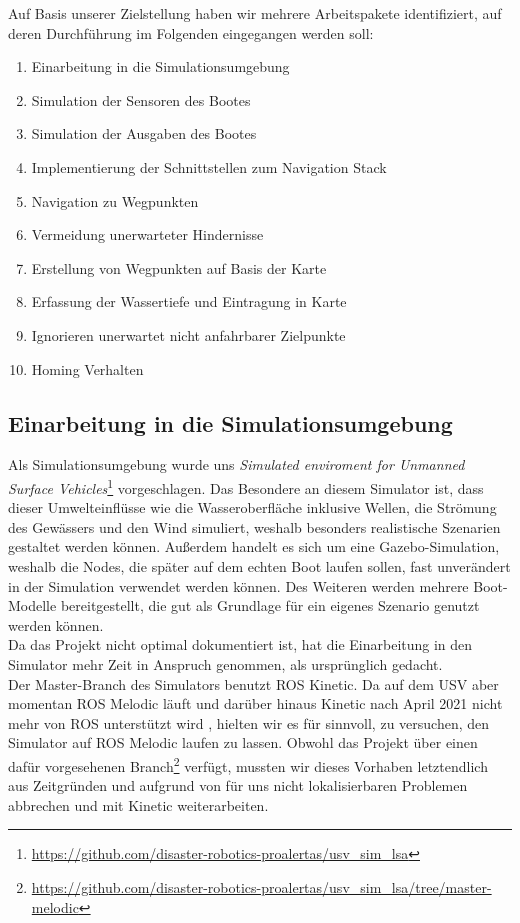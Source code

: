 \documentclass[11pt]{article}
\begin{document}
Auf Basis unserer Zielstellung haben wir mehrere Arbeitspakete identifiziert, auf deren Durchführung im Folgenden eingegangen werden soll:
\begin{enumerate}
	\item Einarbeitung in die Simulationsumgebung
	\item Simulation der Sensoren des Bootes
	\item Simulation der Ausgaben des Bootes
	\item Implementierung der Schnittstellen zum Navigation Stack
	\item Navigation zu Wegpunkten
	\item Vermeidung unerwarteter Hindernisse
	\item Erstellung von Wegpunkten auf Basis der Karte
	\item Erfassung der Wassertiefe und Eintragung in Karte
	\item Ignorieren unerwartet nicht anfahrbarer Zielpunkte
	\item Homing Verhalten

\end{enumerate}

\subsection{Einarbeitung in die Simulationsumgebung}
Als Simulationsumgebung wurde uns \textit{Simulated enviroment for Unmanned Surface Vehicles}\footnote{\url{https://github.com/disaster-robotics-proalertas/usv_sim_lsa}} vorgeschlagen. Das Besondere an diesem Simulator ist, dass dieser Umwelteinflüsse wie die Wasseroberfläche inklusive Wellen, die Strömung des Gewässers und den Wind simuliert, weshalb besonders realistische Szenarien gestaltet werden können. Außerdem handelt es sich um eine Gazebo-Simulation, weshalb die Nodes, die später auf dem echten Boot laufen sollen, fast unverändert in der Simulation verwendet werden können. Des Weiteren werden mehrere Boot-Modelle bereitgestellt, die gut als Grundlage für ein eigenes Szenario genutzt werden können\cite{paravisi2019}.\\

Da das Projekt nicht optimal dokumentiert ist, hat die Einarbeitung in den Simulator mehr Zeit in Anspruch genommen, als ursprünglich gedacht.\\
Der Master-Branch des Simulators benutzt ROS Kinetic. Da auf dem USV aber momentan ROS Melodic läuft und darüber hinaus Kinetic nach April 2021 nicht mehr von ROS unterstützt wird \cite{rosdistros}, hielten wir es für sinnvoll, zu versuchen, den Simulator auf ROS Melodic laufen zu lassen. Obwohl das Projekt über einen dafür vorgesehenen Branch\footnote{\url{https://github.com/disaster-robotics-proalertas/usv_sim_lsa/tree/master-melodic}} verfügt, mussten wir dieses Vorhaben letztendlich aus Zeitgründen und aufgrund von für uns nicht lokalisierbaren Problemen abbrechen und mit Kinetic weiterarbeiten.\newline
\end{document}
